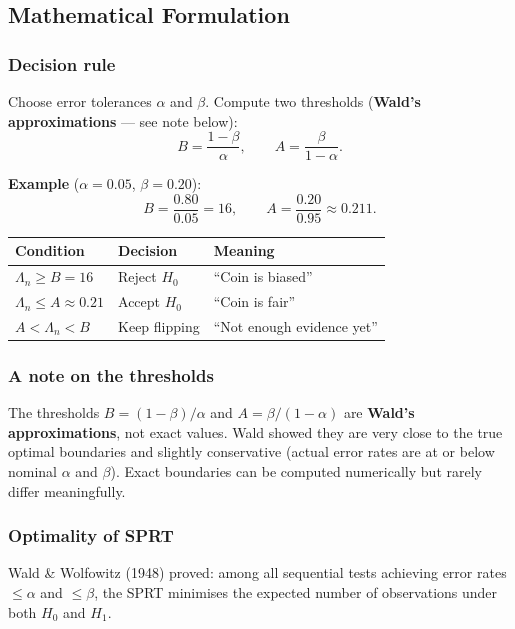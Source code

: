 \documentclass[12pt, a4paper]{article}
\newcommand{\LR}{\Lambda}              %
\begin{document}
\subsection{Mathematical Formulation}

\subsubsection*{Decision rule}

Choose error tolerances $\alpha$ and $\beta$.
Compute two thresholds (\textbf{Wald's approximations} --- see note below):
\[
  \boxed{B = \frac{1-\beta}{\alpha}}, \qquad
  \boxed{A = \frac{\beta}{1-\alpha}}.
\]

\textbf{Example} ($\alpha = 0.05$, $\beta = 0.20$):
\[
  B = \frac{0.80}{0.05} = 16, \qquad
  A = \frac{0.20}{0.95} \approx 0.211.
\]

\begin{center}
\begin{tabular}{@{} l l l @{}}
\toprule
\textbf{Condition} & \textbf{Decision} & \textbf{Meaning} \\
\midrule
$\LR_n \geq B = 16$        & Reject $H_0$  & ``Coin is biased'' \\
$\LR_n \leq A \approx 0.21$  & Accept $H_0$  & ``Coin is fair'' \\
$A < \LR_n < B$            & Keep flipping & ``Not enough evidence yet'' \\
\bottomrule
\end{tabular}
\end{center}

\subsubsection*{A note on the thresholds}

The thresholds $B = (1-\beta)/\alpha$ and $A = \beta/(1-\alpha)$ are
\textbf{Wald's approximations}, not exact values.  Wald showed they are very
close to the true optimal boundaries and slightly conservative (actual error
rates are at or below nominal $\alpha$ and $\beta$).  Exact boundaries can be
computed numerically but rarely differ meaningfully.

\subsubsection*{Optimality of SPRT}

Wald \& Wolfowitz (1948) proved: among all sequential tests achieving error
rates $\leq \alpha$ and $\leq \beta$, the SPRT minimises the expected number
of observations under both $H_0$ and $H_1$.
\end{document}

